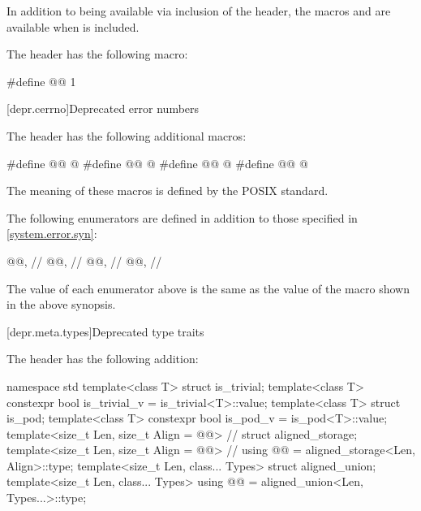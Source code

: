 
\pnum
In addition to being available via inclusion of the  header,
the macros  and  are
available when  is included.


\pnum
The header  has the following macro:
\begin{codeblock}
#define @@ 1
\end{codeblock}


[depr.cerrno]{Deprecated error numbers}

\pnum
The header  has the following additional macros:

\begin{codeblock}
#define @@ @\seebelow@
#define @@ @\seebelow@
#define @@ @\seebelow@
#define @@ @\seebelow@
\end{codeblock}

\pnum
The meaning of these macros is defined by the POSIX standard.

\pnum
The following  enumerators are defined
in addition to those specified in \ref{system.error.syn}:

\begin{codeblock}
@@,               // 
@@,                // 
@@,                       // 
@@,                     // 
\end{codeblock}

\pnum
The value of each  enumerator above
is the same as the value of the  macro
shown in the above synopsis.

[depr.meta.types]{Deprecated type traits}

\pnum
The header 
has the following addition:

\begin{codeblock}
namespace std {
  template<class T> struct is_trivial;
  template<class T> constexpr bool is_trivial_v = is_trivial<T>::value;
  template<class T> struct is_pod;
  template<class T> constexpr bool is_pod_v = is_pod<T>::value;
  template<size_t Len, size_t Align = @@> // \seebelow
    struct aligned_storage;
  template<size_t Len, size_t Align = @@> // \seebelow
    using @@ = aligned_storage<Len, Align>::type;
  template<size_t Len, class... Types>
    struct aligned_union;
  template<size_t Len, class... Types>
    using @@ = aligned_union<Len, Types...>::type;
}
\end{codeblock}

